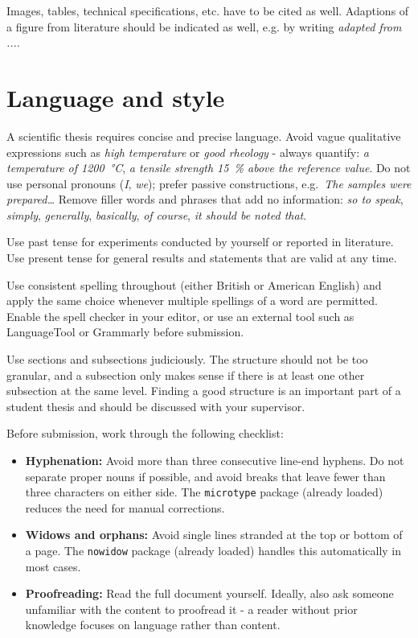 {    Images, tables, technical specifications, etc. have to be cited as well. Adaptions of a figure from literature should be indicated as well, e.g. by writing \emph{adapted from ...}.

    \section*{Language and style}
    A scientific thesis requires concise and precise language.
    Avoid vague qualitative expressions such as \emph{high temperature} or \emph{good rheology} - always quantify: \emph{a temperature of \SI{1200}{\degreeCelsius}}, \emph{a tensile strength \SI{15}{\percent} above the reference value}.
    Do not use personal pronouns (\emph{I}, \emph{we}); prefer passive constructions, e.g.\ \emph{The samples were prepared\ldots}
    Remove filler words and phrases that add no information: \emph{so to speak}, \emph{simply}, \emph{generally}, \emph{basically}, \emph{of course}, \emph{it should be noted that}.

    Use past tense for experiments conducted by yourself or reported in literature. Use present tense for general results and statements that are valid at any time.

    Use consistent spelling throughout (either British or American English) and apply the same choice whenever multiple spellings of a word are permitted.
    Enable the spell checker in your editor, or use an external tool such as LanguageTool or Grammarly before submission.

    Use sections and subsections judiciously. The structure should not be too granular, and a subsection only makes sense if there is at least one other subsection at the same level. Finding a good structure is an important part of a student thesis and should be discussed with your supervisor.

    Before submission, work through the following checklist:
    \begin{itemize}
        \item \textbf{Hyphenation:} Avoid more than three consecutive line-end hyphens. Do not separate proper nouns if possible, and avoid breaks that leave fewer than three characters on either side. The \texttt{microtype} package (already loaded) reduces the need for manual corrections.
        \item \textbf{Widows and orphans:} Avoid single lines stranded at the top or bottom of a page. The \texttt{nowidow} package (already loaded) handles this automatically in most cases.
        \item \textbf{Proofreading:} Read the full document yourself. Ideally, also ask someone unfamiliar with the content to proofread it - a reader without prior knowledge focuses on language rather than content.
    \end{itemize}

}
